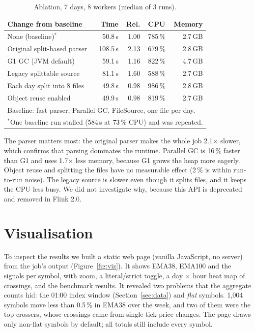 \documentclass[sigconf,nonacm]{acmart}
\begin{document}
\begin{table}[t]
\caption{Ablation, 7 days, 8 workers (median of 3 runs).}\label{tab:ablation}
\begin{tabular}{lrrrr}
\toprule
Change from baseline & Time & Rel. & CPU & Memory \\
\midrule
None (baseline)$^\ast$       &  50.8\,s & 1.00 & 785\,\% & 2.7\,GB \\
Original split-based parser  & 108.5\,s & 2.13 & 679\,\% & 2.8\,GB \\
G1 GC (JVM default)          &  59.1\,s & 1.16 & 822\,\% & 4.7\,GB \\
Legacy splittable source     &  81.1\,s & 1.60 & 588\,\% & 2.7\,GB \\
Each day split into 8 files  &  49.8\,s & 0.98 & 986\,\% & 2.8\,GB \\
Object reuse enabled         &  49.9\,s & 0.98 & 819\,\% & 2.7\,GB \\
\bottomrule
\multicolumn{5}{l}{\footnotesize Baseline: fast parser, Parallel GC, FileSource, one file per day.}\\
\multicolumn{5}{l}{\footnotesize $^\ast$One baseline run stalled (584\,s at 73\,\% CPU) and was repeated.}\\
\end{tabular}
\end{table}

The parser matters most: the original parser makes the whole job 2.1$\times$
slower, which confirms that parsing dominates the runtime. Parallel GC is
16\,\% faster than G1 and uses 1.7$\times$ less memory, because G1 grows the
heap more eagerly. Object reuse and splitting the files have no measurable
effect (2\,\% is within run-to-run noise). The legacy source is slower even
though it splits files, and it keeps the CPU less busy. We did not
investigate why, because this API is deprecated and removed in Flink 2.0.

\section{Visualisation}\label{sec:viz}
To inspect the results we built a static web page (vanilla JavaScript, no
server) from the job's output (Figure~\ref{fig:viz}). It shows EMA38, EMA100
and the signals per symbol, with zoom, a literal/strict toggle, a day $\times$
hour heat map of crossings, and the benchmark results. It revealed two problems
that the aggregate counts hid: the 01:00 index window
(Section~\ref{sec:data}) and \emph{flat} symbols. 1,004 symbols move less than
0.5\,\% in EMA38 over the week, and two of them were the top crossers, whose
crossings came from single-tick price changes. The page draws only non-flat
symbols by default; all totals still include every symbol.
\end{document}
